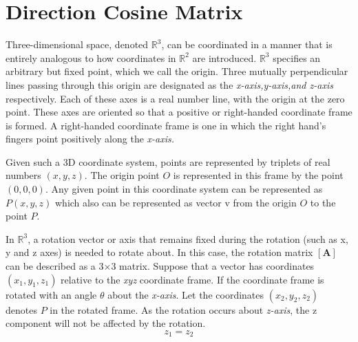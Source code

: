 
\section{Direction Cosine Matrix}

Three-dimensional space, denoted $\mathbb{R}^3$, can be coordinated in a manner that is entirely analogous to how coordinates in $\mathbb{R}^2$ are introduced. $\mathbb{R}^3$ specifies an arbitrary but fixed point, which we call the origin. Three mutually perpendicular lines passing through this origin are designated as the \textit{x-axis,y-axis,and z-axis} respectively. Each of these axes is a real number line, with the origin at the zero point. These axes are oriented so that a positive or right-handed coordinate frame is formed. A right-handed coordinate frame is one in which the right hand's fingers point positively along the \textit{x-axis.}


Given such a 3D coordinate system, points are represented by triplets of real numbers $(x, y, z)$. The origin point $O$ is represented in this frame by the point $(0, 0, 0)$. Any given point in this coordinate system can be represented as $P(x,y,z)$ which also can be represented as vector v from the origin $O$ to the point $P$.


In $\mathbb{R}^3$, a rotation vector or axis that remains fixed during the rotation (such as x, y and z axes) is needed to rotate about. In this case, the rotation matrix $[\textbf{A}]$ can be described as a 3×3 matrix. Suppose that a vector has coordinates $(x_1, y_1, z_1)$ relative to the \textit{xyz} coordinate frame. If the coordinate frame is rotated with an angle $\theta$ about the \textit{x-axis}. Let the coordinates $(x_2, y_2, z_2)$ denotes $P$ in the rotated frame. As the rotation occurs about \textit{z-axis}, the z component will not be affected by the rotation. 
$$z_1=z_2$$

